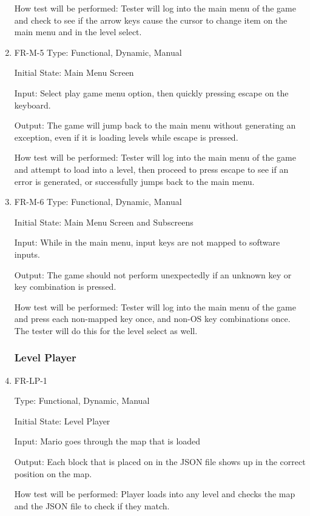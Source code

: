 \documentclass[12pt, titlepage]{article}
\begin{document}
\begin{enumerate}
How test will be performed: Tester will log into the main menu of the game and check to see if the arrow keys cause the cursor to change item on the main menu and in the level select.

\color{red}
\item{FR-M-5}
Type: Functional, Dynamic, Manual

Initial State: Main Menu Screen

Input: Select play game menu option, then quickly pressing escape on the keyboard.

Output: The game will jump back to the main menu without generating an exception, even if it is loading levels while escape is pressed.

How test will be performed: Tester will log into the main menu of the game and attempt to load into a level, then proceed to press escape to see if an error is generated, or successfully jumps back to the main menu.

\item{FR-M-6}
Type: Functional, Dynamic, Manual

Initial State: Main Menu Screen and Subscreens

Input: While in the main menu, input keys are not mapped to software inputs.

Output: The game should not perform unexpectedly if an unknown key or key combination is pressed.

How test will be performed: Tester will log into the main menu of the game and press each non-mapped key once, and non-OS key combinations once. The tester will do this for the level select as well.

\color{Black}

\subsubsection{Level Player}

\item{FR-LP-1}

Type: Functional, Dynamic, Manual

Initial State: Level Player

Input: Mario goes through the map that is loaded

Output: Each block that is placed on in the JSON file shows up in the correct position on the map.

How test will be performed: Player loads into any level and checks the map and the JSON file to check if they match.



\end{enumerate}
\end{document}
